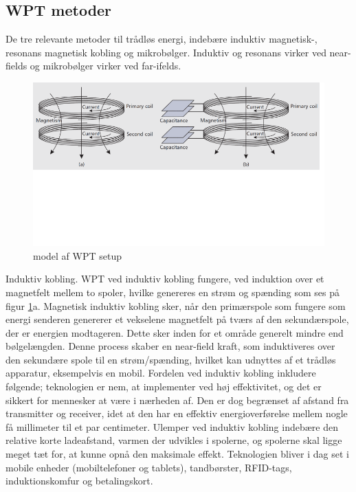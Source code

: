 \subsection{WPT metoder}
De tre relevante metoder til trådløs energi, indebære induktiv magnetisk-, resonans magnetisk kobling og mikrobølger. Induktiv og resonans virker ved near-fields og mikrobølger virker ved far-ifelds. \cite{mikro}

\begin{figure}[H]
\centering
\includegraphics[scale=0.75]{Vildledning/Schematics/induktiv_resonans}
\caption{model af WPT setup \cite{mikro}}
\label{figure:wptsetup}
\end{figure}

Induktiv kobling. 
WPT ved induktiv kobling fungere, ved induktion over et magnetfelt mellem to spoler, hvilke genereres en strøm og spænding som ses på figur \ref{figure:wptsetup}a. Magnetisk induktiv kobling sker, når den primærspole som fungere som energi senderen genererer et vekselene magnetfelt på tværs af den sekundærspole, der er energien modtageren. Dette sker inden for et område generelt mindre end bølgelængden. Denne process skaber en near-field kraft, som induktiveres over den sekundære spole til en strøm/spænding, hvilket kan udnyttes af et trådløs apparatur, eksempelvis en mobil. \cite{mikro}
Fordelen ved induktiv kobling inkludere følgende; teknologien er nem, at implementer ved høj effektivitet, og det er sikkert for mennesker at være i nærheden af. Den er dog begrænset af afstand fra transmitter og receiver, idet at den har en effektiv energioverførelse mellem nogle få millimeter til et par centimeter. Ulemper ved induktiv kobling indebære den relative korte ladeafstand, varmen der udvikles i spolerne, og spolerne skal ligge meget tæt for, at kunne opnå den maksimale effekt.
Teknologien bliver i dag set i mobile enheder (mobiltelefoner og tablets), tandbørster, RFID-tags, induktionskomfur og betalingskort. \cite{mikro}

